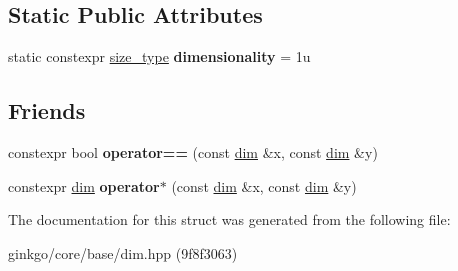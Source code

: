 \subsection*{Static Public Attributes}
\begin{DoxyCompactItemize}
\item 
\mbox{\label{structgko_1_1dim_3_011u_00_01DimensionType_01_4_af991219c5c0f3b362f205a239767f3a3}} 
static constexpr \hyperlink{namespacegko_a6e5c95df0ae4e47aab2f604a22d98ee7}{size\+\_\+type} {\bfseries dimensionality} = 1u
\end{DoxyCompactItemize}
\subsection*{Friends}
\begin{DoxyCompactItemize}
\item 
\mbox{\label{structgko_1_1dim_3_011u_00_01DimensionType_01_4_a5e2c1e99f1c12540aac8489127c5dfb6}} 
constexpr bool {\bfseries operator==} (const \hyperlink{structgko_1_1dim}{dim} \&x, const \hyperlink{structgko_1_1dim}{dim} \&y)
\item 
\mbox{\label{structgko_1_1dim_3_011u_00_01DimensionType_01_4_a27d25e410396817b4ceafbae3d5df5c8}} 
constexpr \hyperlink{structgko_1_1dim}{dim} {\bfseries operator$\ast$} (const \hyperlink{structgko_1_1dim}{dim} \&x, const \hyperlink{structgko_1_1dim}{dim} \&y)
\end{DoxyCompactItemize}


The documentation for this struct was generated from the following file\+:\begin{DoxyCompactItemize}
\item 
ginkgo/core/base/dim.\+hpp (9f8f3063)\end{DoxyCompactItemize}
